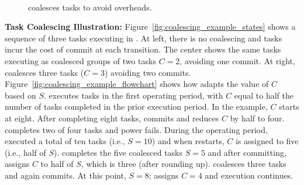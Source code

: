 \begin{figure}
	\centering
	\\
	\caption{\sys coalesces tasks to avoid overheads.}
	\label{fig:coalescing_example}
\end{figure}

\noindent\textbf{Task Coalescing Illustration:}
Figure~\ref{fig:coalescing_example_states} shows a sequence of three tasks
executing in \sys. At left, there is no coalescing and tasks incur the cost of
commit at each transition. The center shows the same tasks executing as
coalesced groups of two tasks $C=2$, avoiding one commit.  At right, \sys
coalesces three tasks ($C=3$) avoiding two commits.
Figure~\ref{fig:coalescing_example_flowchart} shows how \sys adapts the value
of $C$ based on $S$. \sys executes tasks in the first operating period, with
$C$ equal to half the number of tasks completed in the prior execution period.
In the example, $C$ starts at eight. After completing eight tasks, \sys commits
and reduces $C$ by half to four.  \sys completes two of four tasks and power
fails.  During the operating period, \sys executed a total of ten tasks (i.e.,
$S=10$) and when \sys restarts, $C$ is assigned to five (i.e., half of $S$).
\sys completes the five coalesced tasks $S=5$ and after committing, assigns $C$
to half of $S$, which is three (after rounding up). \sys coalesces three tasks
and again commits.  At this point, $S=8$; \sys assigns $C=4$ and execution
continues.


